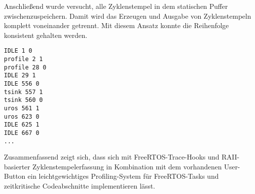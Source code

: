 Anschließend wurde versucht, alle Zyklenstempel in dem statischen Puffer
zwischenzuspeichern. Damit wird das Erzeugen und Ausgabe von Zyklenstempeln
komplett voneinander getrennt. Mit diesem Ansatz konnte die Reihenfolge
konsistent gehalten werden.

\begin{code}
\begin{verbatim}
IDLE 1 0
profile 2 1
profile 28 0
IDLE 29 1
IDLE 556 0
tsink 557 1
tsink 560 0
uros 561 1
uros 623 0
IDLE 625 1
IDLE 667 0
...
\end{verbatim}
\end{code}

Zusammenfassend zeigt sich, dass sich mit FreeRTOS-Trace-Hooks und
RAII-basierter Zyklenstempelerfassung in Kombination mit dem vorhandenen
User-Button ein leichtgewichtiges Profiling-System für FreeRTOS-Tasks und
zeitkritische Codeabschnitte implementieren lässt.

